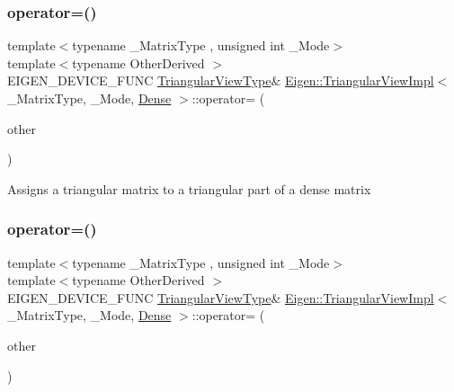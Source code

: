 \subsubsection{\texorpdfstring{operator=()}{operator=()}\hspace{0.1cm}{\footnotesize\ttfamily [1/2]}}
{\footnotesize\ttfamily template$<$typename \+\_\+\+Matrix\+Type , unsigned int \+\_\+\+Mode$>$ \\
template$<$typename Other\+Derived $>$ \\
E\+I\+G\+E\+N\+\_\+\+D\+E\+V\+I\+C\+E\+\_\+\+F\+U\+NC \mbox{\hyperlink{class_eigen_1_1_triangular_view}{Triangular\+View\+Type}}\& \mbox{\hyperlink{class_eigen_1_1_triangular_view_impl}{Eigen\+::\+Triangular\+View\+Impl}}$<$ \+\_\+\+Matrix\+Type, \+\_\+\+Mode, \mbox{\hyperlink{struct_eigen_1_1_dense}{Dense}} $>$\+::operator= (\begin{DoxyParamCaption}\item[{const \mbox{\hyperlink{class_eigen_1_1_triangular_base}{Triangular\+Base}}$<$ Other\+Derived $>$ \&}]{other }\end{DoxyParamCaption})}

Assigns a triangular matrix to a triangular part of a dense matrix \mbox{\label{class_eigen_1_1_triangular_view_impl_3_01___matrix_type_00_01___mode_00_01_dense_01_4_a66e679534fec114cd788ab8c43540bf7}} 
\subsubsection{\texorpdfstring{operator=()}{operator=()}\hspace{0.1cm}{\footnotesize\ttfamily [2/2]}}
{\footnotesize\ttfamily template$<$typename \+\_\+\+Matrix\+Type , unsigned int \+\_\+\+Mode$>$ \\
template$<$typename Other\+Derived $>$ \\
E\+I\+G\+E\+N\+\_\+\+D\+E\+V\+I\+C\+E\+\_\+\+F\+U\+NC \mbox{\hyperlink{class_eigen_1_1_triangular_view}{Triangular\+View\+Type}}\& \mbox{\hyperlink{class_eigen_1_1_triangular_view_impl}{Eigen\+::\+Triangular\+View\+Impl}}$<$ \+\_\+\+Matrix\+Type, \+\_\+\+Mode, \mbox{\hyperlink{struct_eigen_1_1_dense}{Dense}} $>$\+::operator= (\begin{DoxyParamCaption}\item[{const \mbox{\hyperlink{class_eigen_1_1_matrix_base}{Matrix\+Base}}$<$ Other\+Derived $>$ \&}]{other }\end{DoxyParamCaption})}

